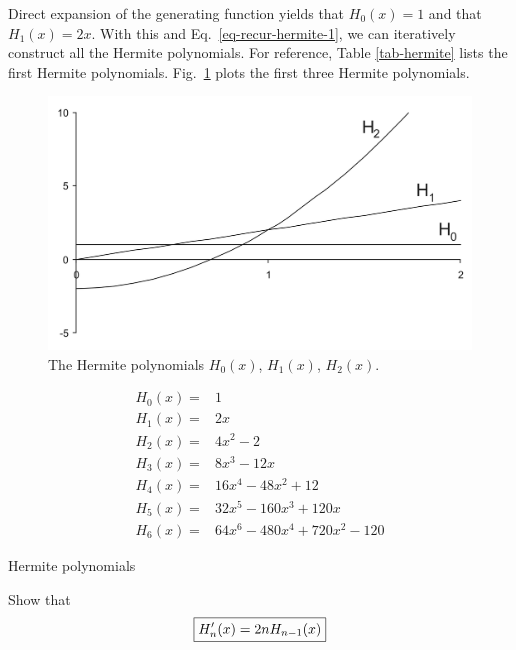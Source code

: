 Direct expansion of the generating function yields that $H_0(x) = 1$ and that $H_1(x) = 2x$. With this and Eq.~\ref{eq-recur-hermite-1}, we can iteratively construct all the Hermite polynomials. For reference, Table \ref{tab-hermite} lists the first Hermite polynomials. Fig.~\ref{fig-hermite} plots the first three Hermite polynomials.

\begin{figure}
\centering
\includegraphics[scale=0.7]{special/figures/hermite}
\caption{The Hermite polynomials $H_0(x)$, $H_1(x)$, $H_2(x)$.}
\label{fig-hermite}
\end{figure}

\begin{table}
\begin{align}
H_0(x) = & 1 \nonumber \\
H_1(x) = & 2x \nonumber \\
H_2(x) = & 4x^2-2 \nonumber \\
H_3(x) = & 8x^3-12x \nonumber \\
H_4(x) = & 16x^4-48x^2+12 \nonumber \\
H_5(x) = & 32x^5-160x^3+120x \nonumber \\
H_6(x) = & 64x^6-480x^4+720x^2-120 \nonumber
\end{align}
\caption{Hermite polynomials}
\label{tab-hermite}
\end{table}  

\begin{sidebar}
\begin{ex}
Show that
$$\fbox{$\displaystyle H_n'(x) = 2nH_{n-1}(x)$}$$ \label{eq-recur-hermite-2}
\end{ex}
\end{sidebar}


